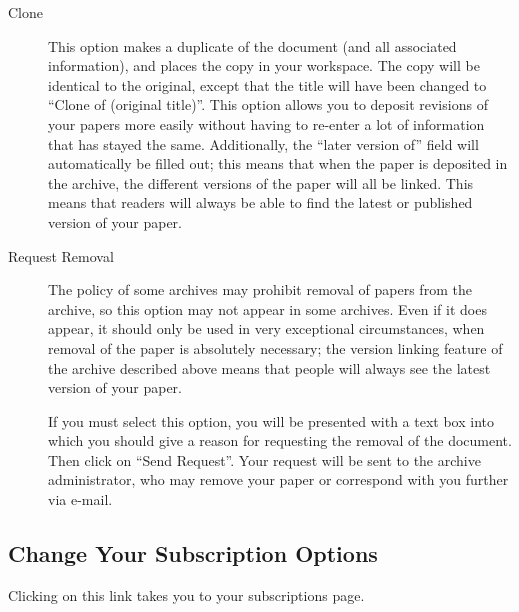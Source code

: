 \begin{description}

\item[Clone]

This option makes a duplicate of the document (and all associated information), and places the copy in your workspace. The copy will be identical to the original, except that the title will have been changed to ``Clone of (original title)''. This option allows you to deposit revisions of your papers more easily without having to re-enter a lot of information that has stayed the same. Additionally, the ``later version of'' field will automatically be filled out; this means that when the paper is deposited in the archive, the different versions of the paper will all be linked. This means that readers will always be able to find the latest or published version of your paper.


\item[Request Removal]

The policy of some archives may prohibit removal of papers from the archive, so this option may not appear in some archives. Even if it does appear, it should only be used in very exceptional circumstances, when removal of the paper is absolutely necessary; the version linking feature of the archive described above means that people will always see the latest version of your paper.

If you must select this option, you will be presented with a text box into which you should give a reason for requesting the removal of the document. Then click on ``Send Request''. Your request will be sent to the archive administrator, who may remove your paper or correspond with you further via e-mail.

\end{description}


\subsection{Change Your Subscription Options}

Clicking on this link takes you to your subscriptions page.
